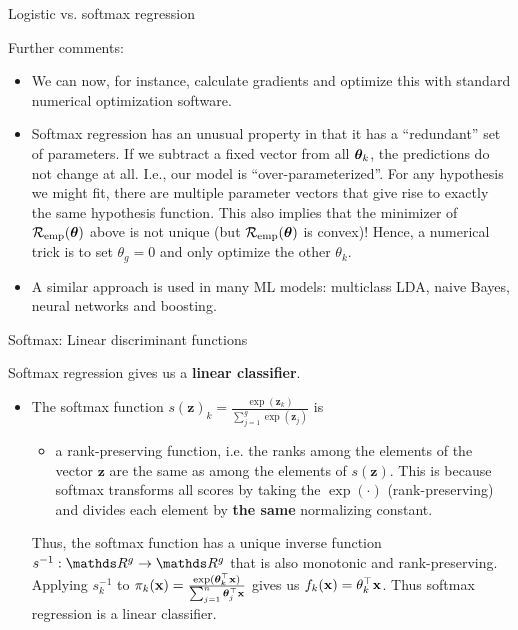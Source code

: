 \documentclass[11pt,compress,t,notes=noshow, xcolor=table]{beamer}
\begin{document}
    \begin{vbframe}{Logistic vs. softmax regression}

    Further comments:

    \begin{itemize}

    \item We can now, for instance, calculate gradients and optimize this with standard numerical optimization software.


    \item Softmax regression has an unusual property in that it has a \enquote{redundant} set of parameters. If we subtract a fixed vector
      from all $\bm{\theta}_k$, the predictions do not change at all.
      I.e.,  our model is \enquote{over-parameterized}. For any hypothesis we might fit,
      there are multiple parameter vectors that give rise to exactly the same hypothesis function.
      This also implies that the minimizer of $\mathcal{R}_{\text{emp}}(\bm{\theta})$ above is not unique (but $\mathcal{R}_{\text{emp}}(\bm{\theta})$ is convex)!
      Hence, a numerical trick is to set $\theta_g = 0$ and only optimize the other $\theta_k$.

    \item A similar approach is used in many ML models: multiclass LDA, naive Bayes, neural networks and boosting.

    \end{itemize}

    \end{vbframe}

    \begin{vbframe}{Softmax: Linear discriminant functions}

    Softmax regression gives us a \textbf{linear classifier}.

    \begin{itemize}
      \item The softmax function $s(\bm{z})_k = \frac{\exp(\bm{z}_k)}{\sum_{j = 1}^g \exp \left(\bm{z}_j\right)}$ is

    \begin{itemize}
      \item a rank-preserving function, i.e. the ranks among the elements of the vector $\bm{z}$ are the same as among the elements of $s(\bm{z})$. This is because softmax transforms all scores by taking the $\exp(\cdot)$ (rank-preserving) and divides each element by \textbf{the same} normalizing constant.
    \end{itemize}

    Thus, the softmax function has a unique inverse function $s^{-1}: \R^g \to \R^g$ that is also monotonic and rank-preserving. Applying $s_k^{-1}$ to $\pi_k(\mathbf{x}) = \frac{\exp(\bm{\theta}_k^\top \mathbf{x})}{\sum_{j = 1}^n \bm{\theta}_j^\top \mathbf{x}}$ gives us $f_k(\mathbf{x}) = \theta_k^\top \mathbf{x}$. Thus softmax regression is a linear classifier.
    \end{itemize}

    \end{vbframe}

    \endlecture
\end{document}
